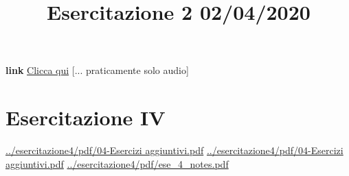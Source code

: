 \title{Esercitazione 2 02/04/2020}\newline
\textbf{link} \href{https://web.microsoftstream.com/video/d71ffb36-a843-491f-a33d-da4a7d0b0af9}{Clicca qui} [... praticamente solo audio]
\section{Esercitazione IV}
\url{../esercitazione4/pdf/04-Esercizi aggiuntivi.pdf}\newline
\url{../esercitazione4/pdf/04-Esercizi aggiuntivi.pdf}\newline
\url{../esercitazione4/pdf/ese_4_notes.pdf}